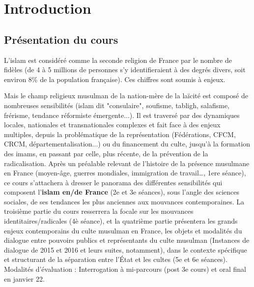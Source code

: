 \chapter{Introduction}


\section{Présentation du cours} 
L’islam est considéré comme la seconde religion de France par
le nombre de fidèles (de 4 à 5 millions de personnes s'y identifieraient à des degrés
divers, soit environ 8\% de la population française). Ces chiffres sont soumis à enjeux.

Mais le champ religieux musulman
de la nation-mère de la laïcité est composé de nombreuses sensibilités (islam dit
"consulaire", soufisme, tabligh, salafisme, frérisme, tendance réformiste émergente...).
Il est traversé par des dynamiques locales, nationales et transnationales complexes et
fait face à des enjeux multiples, depuis la problématique de la représentation
(Fédérations, CFCM, CRCM, départementalisation...) ou du financement du culte,
jusqu'à la formation des imams, en passant par celle, plus récente, de la prévention de la
radicalisation. Après un préalable relevant de l’histoire de la présence musulmane en
France (moyen-âge, guerres mondiales, immigration de travail…, 1ere séance), ce cours
s'attachera à dresser le panorama des différentes sensibilités qui composent l'\textbf{islam en/de
France} (2e et 3e
séances), sous l’angle des sciences sociales, de ses tendances les plus
anciennes aux mouvances contemporaines. La troisième partie du cours resserrera la
focale sur les mouvances identitaires/radicales (4è séance), et la quatrième partie
présentera les grands enjeux contemporains du culte musulman en France, les objets et
modalités du dialogue entre pouvoirs publics et représentants du culte musulman
(Instances de dialogue de 2015 et 2016 et leurs suites, notamment), dans le contexte
spécifique et structurant de la séparation entre l’État et les cultes (5e
et 6e
séances).
Modalités d’évaluation : Interrogation à mi-parcours (post 3e
cours) et oral final en janvier 22.




